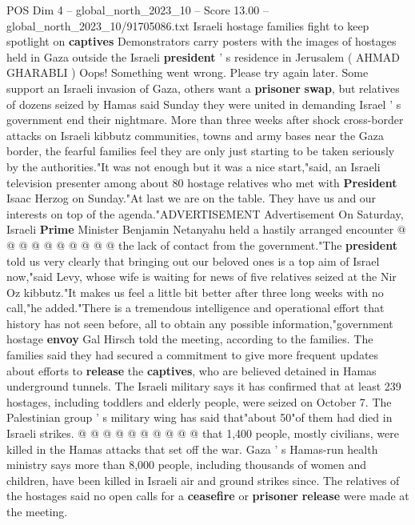 \begin{textsample}{POS Dim 4 – global\_north\_2023\_10 – Score 13.00 – global\_north\_2023\_10/91705086.txt}  \label{ex:f4_pos_448}
Israeli hostage families fight to keep spotlight on \textbf{captives} Demonstrators carry posters with the images of hostages held in Gaza outside the Israeli \textbf{president} ' s residence in Jerusalem ( AHMAD GHARABLI ) Oops!
Something went wrong.
Please try again later.
Some support an Israeli invasion of Gaza, others want a \textbf{prisoner} \textbf{swap}, but relatives of dozens seized by Hamas said Sunday they were united in demanding Israel ' s government end their nightmare.
More than three weeks after shock cross-border attacks on Israeli kibbutz communities, towns and army bases near the Gaza border, the fearful families feel they are only just starting to be taken seriously by the authorities."It was not enough but it was a nice start,"said, an Israeli television presenter among about 80 hostage relatives who met with \textbf{President} Isaac Herzog on Sunday."At last we are on the table.
They have us and our interests on top of the agenda."ADVERTISEMENT Advertisement On Saturday, Israeli \textbf{Prime} Minister Benjamin Netanyahu held a hastily arranged encounter @ @ @ @ @ @ @ @ @ @ the lack of contact from the government."The \textbf{president} told us very clearly that bringing out our beloved ones is a top aim of Israel now,"said Levy, whose wife is waiting for news of five relatives seized at the Nir Oz kibbutz."It makes us feel a little bit better after three long weeks with no call,"he added."There is a tremendous intelligence and operational effort that history has not seen before, all to obtain any possible information,"government hostage \textbf{envoy} Gal Hirsch told the meeting, according to the families.
The families said they had secured a commitment to give more frequent updates about efforts to \textbf{release} the \textbf{captives}, who are believed detained in Hamas underground tunnels.
The Israeli military says it has confirmed that at least 239 hostages, including toddlers and elderly people, were seized on October 7.
The Palestinian group ' s military wing has said that"about 50"of them had died in Israeli strikes. @ @ @ @ @ @ @ @ @ @ that 1,400 people, mostly civilians, were killed in the Hamas attacks that set off the war.
Gaza ' s Hamas-run health ministry says more than 8,000 people, including thousands of women and children, have been killed in Israeli air and ground strikes since.
The relatives of the hostages said no open calls for a \textbf{ceasefire} or \textbf{prisoner} \textbf{release} were made at the meeting.

\end{textsample}
